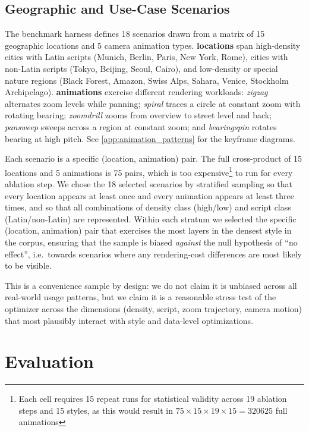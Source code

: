 {\subsection{Geographic and Use-Case Scenarios}\label{sub:scenarios}

The benchmark harness defines 18 scenarios drawn from a matrix of 15 geographic locations and 5 camera animation types.
\textbf{locations} span high-density cities with Latin scripts (Munich, Berlin, Paris, New York, Rome), cities with non-Latin scripts (Tokyo, Beijing, Seoul, Cairo), and low-density or special nature regions (Black Forest, Amazon, Swiss Alps, Sahara, Venice, Stockholm Archipelago).
\textbf{animations} exercise different rendering workloads:
\emph{zigzag} alternates zoom levels while panning;
\emph{spiral} traces a circle at constant zoom with rotating bearing;
\emph{zoomdrill} zooms from overview to street level and back;
\emph{pansweep} sweeps across a region at constant zoom;
and \emph{bearingspin} rotates bearing at high pitch.
See \cref{app:animation_patterns} for the keyframe diagrams.

Each scenario is a specific (location, animation) pair.
The full cross-product of 15 locations and 5 animations is 75 pairs, which is too expensive\footnote{Each cell requires 15 repeat runs for statistical validity across 19 ablation steps and 15 styles, as this would result in $75 \times 15 \times 19 \times 15 = \num{320625}$ full animations} to run for every ablation step.
We chose the 18 selected scenarios by stratified sampling so that every location appears at least once and every animation appears at least three times, and so that all combinations of density class (high/low) and script class (Latin/non-Latin) are represented.
Within each stratum we selected the specific (location, animation) pair that exercises the most layers in the densest style in the corpus, ensuring that the sample is biased \emph{against} the null hypothesis of \enquote{no effect}, i.e.\ towards scenarios where any rendering-cost differences are most likely to be visible.

This is a convenience sample by design:
we do not claim it is unbiased across all real-world usage patterns, but we claim it is a reasonable stress test of the optimizer across the dimensions (density, script, zoom trajectory, camera motion) that most plausibly interact with style and data-level optimizations.

\section{Evaluation}\label{sec:evaluation}

}
